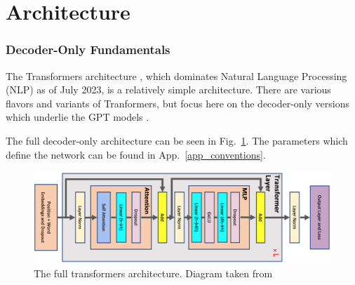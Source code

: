\part{Architecture}

\section{Decoder-Only Fundamentals \label{sec_decoder_only} }

The Transformers architecture \cite{vaswani2017attention}, which dominates Natural Language
Processing (NLP) as of July 2023, is a relatively simple architecture. There are various flavors and
variants of Tranformers, but focus here on the decoder-only versions which underlie the
GPT models \cite{gpt2radford2019language, gpt3brown2020language, gpt4openai2023}.

The full decoder-only architecture can be seen in Fig.~\ref{fig_transformers_architecture}. The
parameters which define the network can be found in App.~\ref{app_conventions}.
\begin{figure}[ht]
	\centering
	\includegraphics[scale=0.28]{figures/transformer-general.jpg}
	\caption{The full transformers architecture. Diagram taken from \cite{korthikanti2022reducing} }
	\label{fig_transformers_architecture}
\end{figure}

